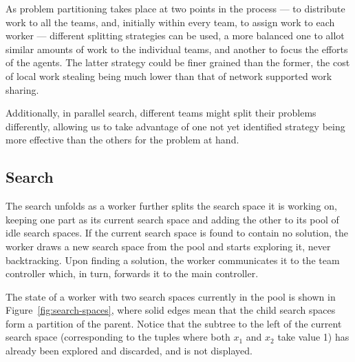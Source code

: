 \documentclass{llncs}
\begin{document}
As problem partitioning takes place at two points in the process ---
to distribute work to all the teams, and, initially within every team,
to assign work to each worker --- different splitting strategies can
be used, a more balanced one to allot similar amounts of work to the
individual teams, and another to focus the efforts of the agents. The
latter strategy could be finer grained than the former, the cost of
local work stealing being much lower than that of network supported
work sharing.

Additionally, in parallel search, different teams might split their
problems differently, allowing us to take advantage of one not yet
identified strategy being more effective than the others for the
problem at hand.

\subsection{Search}

The search unfolds as a worker further splits the search space it is
working on, keeping one part as its current search space and adding
the other to its pool of idle search spaces. If the current search
space is found to contain no solution, the worker draws a new search
space from the pool and starts exploring it, never backtracking. Upon
finding a solution, the worker communicates it to the team controller
which, in turn, forwards it to the main controller.

The state of a worker with two search spaces currently in the pool is
shown in Figure~\ref{fig:search-spaces}, where solid edges mean that
the child search spaces form a partition of the parent. Notice that
the subtree to the left of the current search space (corresponding to
the tuples where both $x_1$ and $x_2$ take value 1) has already been
explored and discarded, and is not displayed.
\end{document}
